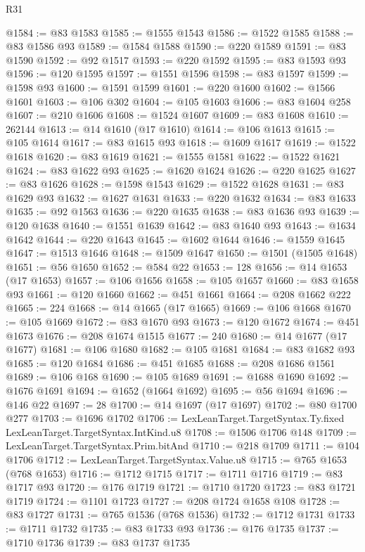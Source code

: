 \begin{lexlean}{R31}
\begin{coremodule}
@1584 := @83 @1583
@1585 := @1555 @1543
@1586 := @1522 @1585
@1588 := @83 @1586 @93
@1589 := @1584 @1588
@1590 := @220 @1589
@1591 := @83 @1590
@1592 := @92 @1517
@1593 := @220 @1592
@1595 := @83 @1593 @93
@1596 := @120 @1595
@1597 := @1551 @1596
@1598 := @83 @1597
@1599 := @1598 @93
@1600 := @1591 @1599
@1601 := @220 @1600
@1602 := @1566 @1601
@1603 := @106 @302
@1604 := @105 @1603
@1606 := @83 @1604 @258
@1607 := @210 @1606
@1608 := @1524 @1607
@1609 := @83 @1608
@1610 := 262144
@1613 := @14 @1610 (@17 @1610)
@1614 := @106 @1613
@1615 := @105 @1614
@1617 := @83 @1615 @93
@1618 := @1609 @1617
@1619 := @1522 @1618
@1620 := @83 @1619
@1621 := @1555 @1581
@1622 := @1522 @1621
@1624 := @83 @1622 @93
@1625 := @1620 @1624
@1626 := @220 @1625
@1627 := @83 @1626
@1628 := @1598 @1543
@1629 := @1522 @1628
@1631 := @83 @1629 @93
@1632 := @1627 @1631
@1633 := @220 @1632
@1634 := @83 @1633
@1635 := @92 @1563
@1636 := @220 @1635
@1638 := @83 @1636 @93
@1639 := @120 @1638
@1640 := @1551 @1639
@1642 := @83 @1640 @93
@1643 := @1634 @1642
@1644 := @220 @1643
@1645 := @1602 @1644
@1646 := @1559 @1645
@1647 := @1513 @1646
@1648 := @1509 @1647
@1650 := @1501 (@1505 @1648)
@1651 := @56 @1650
@1652 := @584 @22
@1653 := 128
@1656 := @14 @1653 (@17 @1653)
@1657 := @106 @1656
@1658 := @105 @1657
@1660 := @83 @1658 @93
@1661 := @120 @1660
@1662 := @451 @1661
@1664 := @208 @1662 @222
@1665 := 224
@1668 := @14 @1665 (@17 @1665)
@1669 := @106 @1668
@1670 := @105 @1669
@1672 := @83 @1670 @93
@1673 := @120 @1672
@1674 := @451 @1673
@1676 := @208 @1674 @1515
@1677 := 240
@1680 := @14 @1677 (@17 @1677)
@1681 := @106 @1680
@1682 := @105 @1681
@1684 := @83 @1682 @93
@1685 := @120 @1684
@1686 := @451 @1685
@1688 := @208 @1686 @1561
@1689 := @106 @168
@1690 := @105 @1689
@1691 := @1688 @1690
@1692 := @1676 @1691
@1694 := @1652 (@1664 @1692)
@1695 := @56 @1694
@1696 := @146 @22
@1697 := 28
@1700 := @14 @1697 (@17 @1697)
@1702 := @80 @1700 @277
@1703 := @1696 @1702
@1706 := LexLeanTarget.TargetSyntax.Ty.fixed LexLeanTarget.TargetSyntax.IntKind.u8
@1708 := @1506 @1706 @148
@1709 := LexLeanTarget.TargetSyntax.Prim.bitAnd
@1710 := @218 @1709
@1711 := @104 @1706
@1712 := LexLeanTarget.TargetSyntax.Value.u8
@1715 := @765 @1653 (@768 @1653)
@1716 := @1712 @1715
@1717 := @1711 @1716
@1719 := @83 @1717 @93
@1720 := @176 @1719
@1721 := @1710 @1720
@1723 := @83 @1721 @1719
@1724 := @1101 @1723
@1727 := @208 @1724 @1658 @108
@1728 := @83 @1727
@1731 := @765 @1536 (@768 @1536)
@1732 := @1712 @1731
@1733 := @1711 @1732
@1735 := @83 @1733 @93
@1736 := @176 @1735
@1737 := @1710 @1736
@1739 := @83 @1737 @1735

\end{coremodule}
\end{lexlean}
